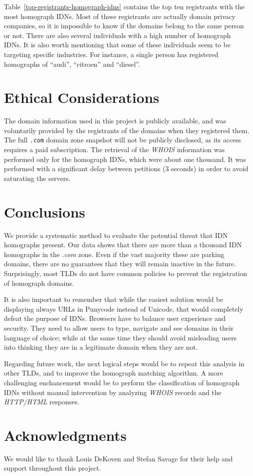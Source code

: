 \documentclass[letterpaper,twocolumn,10pt]{article}
\begin{document}
Table~\ref{top-registrants-homograph-idns} contains the top ten registrants with the most homograph IDNs.
Most of these registrants are actually domain privacy companies, so it is impossible to know if the domains belong to the same person or not.
There are also several individuals with a high number of homograph IDNs.
It is also worth mentioning that some of these individuals seem to be targeting specific industries.
For instance, a single person has registered homographs of ``audi'', ``citroen'' and ``diesel''.

\section{Ethical Considerations}
The domain information used in this project is publicly available, and was voluntarily provided by the registrants of the domains when they registered them.
The full \texttt{.com} domain zone snapshot will not be publicly disclosed, as its access requires a paid subscription.
The retrieval of the \textit{WHOIS} information was performed only for the homograph IDNs, which were about one thousand.
It was performed with a significant delay between petitions (3 seconds) in order to avoid saturating the servers.

\section{Conclusions}
We provide a systematic method to evaluate the potential threat that IDN homographs present.
Our data shows that there are more than a thousand IDN homographs in the \textit{.com} zone.
Even if the vast majority these are parking domains, there are no guarantees that they will remain inactive in the future.
Surprisingly, most TLDs do not have common policies to prevent the registration of homograph domains.

It is also important to remember that while the easiest solution would be displaying always URLs in Punycode instead of Unicode, that would completely defeat the purpose of IDNs.
Browsers have to balance user experience and security.
They need to allow users to type, navigate and see domains in their language of choice; while at the same time they should avoid misleading users into thinking they are in a legitimate domain when they are not.

Regarding future work, the next logical steps would be to repeat this analysis in other TLDs, and to improve the homograph matching algorithm.
A more challenging enchancement would be to perform the classification of homograph IDNs without manual intervention by analyzing \textit{WHOIS} records and the \textit{HTTP/HTML} responses.

\section*{Acknowledgments}
We would like to thank Louis DeKoven and Stefan Savage for their help and support throughout this project.

{\footnotesize 
}

\theendnotes
\end{document}

